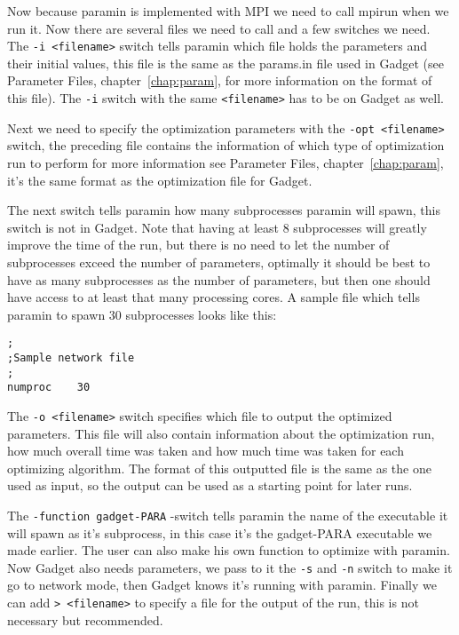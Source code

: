 \documentclass[10pt,twoside]{book}
\begin{document}
Now because paramin is implemented with MPI we need to call mpirun when we run it.  Now there are several files we need to call and a few switches we need. The \texttt{-i <filename>} switch tells paramin which file holds the parameters and their initial values, this file is the same as the params.in file used in Gadget (see Parameter Files, chapter~\ref{chap:param}, for more information on the format of this file). The \texttt{-i} switch with the same \texttt{<filename>} has to be on Gadget as well.

Next we need to specify the optimization parameters with the \texttt{-opt <filename>} switch, the preceding file contains the information of which type of optimization run to perform for more information see Parameter Files, chapter~\ref{chap:param}, it's the same format as the optimization file for Gadget.

The next switch tells paramin how many subprocesses paramin will spawn, this switch is not in Gadget.  Note that having at least 8 subprocesses will greatly improve the time of the run, but there is no need to let the number of subprocesses exceed the number of parameters, optimally it should be best to have as many subprocesses as the number of parameters, but then one should have access to at least that many processing cores.  A sample file which tells paramin to spawn 30 subprocesses looks like this:

{\small\begin{verbatim}
;
;Sample network file
;
numproc    30
\end{verbatim}}

The \texttt{-o <filename>} switch specifies which file to output the optimized parameters.  This file will also contain information about the optimization run, how much overall time was taken and how much time was taken for each optimizing algorithm.  The format of this outputted file is the same as the one used as input, so the output can be used as a starting point for later runs.

The \texttt{-function gadget-PARA} -switch tells paramin the name of the executable it will spawn as it's subprocess, in this case it's the gadget-PARA executable we made earlier.  The user can also make his own function to optimize with paramin.  Now Gadget also needs parameters, we pass to it the \texttt{-s} and \texttt{-n} switch to make it go to network mode, then Gadget knows it's running with paramin.  Finally we can add \texttt{> <filename>} to specify a file for the output of the run, this is not necessary but recommended.
\end{document}
